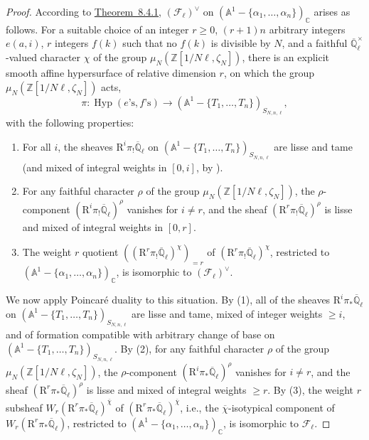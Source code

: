 \begin{proof}
According to \hyperref[thm:8.4.1]{Theorem~8.4.1}, \((\mathcal{F}_\ell)^\vee\) on \((\mathbb{A}^1-\{\alpha_1,\ldots,\alpha_n\})_{\mathbb{C}}\) arises as follows. For a suitable choice of an integer \(r\geq0\), \((r+1)n\) arbitrary integers \(e(a,i)\), \(r\) integers \(f(k)\) such that no \(f(k)\) is divisible by \(N\), and a faithful \(\overline{\mathbb{Q}}_\ell^{\times}\)-valued character \(\chi\) of the group \(\mu_N(\mathbb{Z}[1/N\ell,\zeta_N])\), there is an explicit smooth affine hypersurface of relative dimension \(r\), on which the group \(\mu_N(\mathbb{Z}[1/N\ell,\zeta_N])\) acts,
\[
\pi:\operatorname{Hyp}(e\text{'s},f\text{'s})\to(\mathbb{A}^1-\{T_1,\ldots,T_n\})_{S_{N,n,\ell}},
\]
with the following properties:
\begin{enumerate}[label=(\arabic*)]
\item For all \(i\), the sheaves \(\mathrm{R}^i\pi_!\overline{\mathbb{Q}}_\ell\) on \((\mathbb{A}^1-\{T_1,\ldots,T_n\})_{S_{N,n,\ell}}\) are lisse and tame (and mixed of integral weights in \([0,i]\), by \cite{De-WeilII}).
\item For any faithful character \(\rho\) of the group \(\mu_N(\mathbb{Z}[1/N\ell,\zeta_N])\), the \(\rho\)-component \((\mathrm{R}^i\pi_!\overline{\mathbb{Q}}_\ell)^\rho\) vanishes for \(i\ne r\), and the sheaf \((\mathrm{R}^r\pi_!\overline{\mathbb{Q}}_\ell)^\rho\) is lisse and mixed of integral weights in \([0,r]\).
\item The weight \(r\) quotient \(((\mathrm{R}^r\pi_!\overline{\mathbb{Q}}_\ell)^\chi)_{=r}\) of \((\mathrm{R}^r\pi_!\overline{\mathbb{Q}}_\ell)^\chi\), restricted to \((\mathbb{A}^1-\{\alpha_1,\ldots,\alpha_n\})_{\mathbb{C}}\), is isomorphic to \((\mathcal{F}_\ell)^\vee\).
\end{enumerate}

We now apply Poincaré duality to this situation. By (1), all of the sheaves \(\mathrm{R}^i\pi_*\overline{\mathbb{Q}}_\ell\) on \((\mathbb{A}^1-\{T_1,\ldots,T_n\})_{S_{N,n,\ell}}\) are lisse and tame, mixed of integer weights \(\geq i\), and of formation compatible with arbitrary change of base on \((\mathbb{A}^1-\{T_1,\ldots,T_n\})_{S_{N,n,\ell}}\). By (2), for any faithful character \(\rho\) of the group \(\mu_N(\mathbb{Z}[1/N\ell,\zeta_N])\), the \(\rho\)-component \((\mathrm{R}^i\pi_*\overline{\mathbb{Q}}_\ell)^\rho\) vanishes for \(i\ne r\), and the sheaf \((\mathrm{R}^r\pi_*\overline{\mathbb{Q}}_\ell)^\rho\) is lisse and mixed of integral weights \(\geq r\). By (3), the weight \(r\) subsheaf \(W_r(\mathrm{R}^r\pi_*\overline{\mathbb{Q}}_\ell)^{\overline{\chi}}\) of \((\mathrm{R}^r\pi_*\overline{\mathbb{Q}}_\ell)^{\overline{\chi}}\), i.e., the \(\overline{\chi}\)-isotypical component of \(W_r(\mathrm{R}^r\pi_*\overline{\mathbb{Q}}_\ell)\), restricted to \((\mathbb{A}^1-\{\alpha_1,\ldots,\alpha_n\})_{\mathbb{C}}\), is isomorphic to \(\mathcal{F}_\ell\).


\end{proof}
